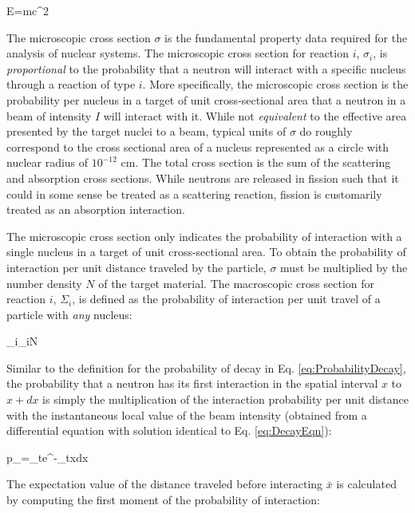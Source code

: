 \beq
E=mc^2
\eeq



The microscopic cross section \(\sigma\) is the fundamental property data required for the analysis of nuclear systems. The microscopic cross section for reaction \(i\), \(\sigma_i\), is {\it proportional} to the probability that a neutron will interact with a specific nucleus through a reaction of type \(i\). More specifically, the microscopic cross section is the probability per nucleus in a target of unit cross-sectional area that a neutron in a beam of intensity \(I\) will interact with it. While not {\it equivalent} to the effective area presented by the target nuclei to a beam, typical units of \(\sigma\) do roughly correspond to the cross sectional area of a nucleus represented as a circle with nuclear radius of \(10^{-12}\) cm. The total cross section is the sum of the scattering and absorption cross sections. While neutrons are released in fission such that it could in some sense be treated as a scattering reaction, fission is customarily treated as an absorption interaction.

The microscopic cross section only indicates the probability of interaction with a single nucleus in a target of unit cross-sectional area. To obtain the probability of interaction per unit distance traveled by the particle, \(\sigma\) must be multiplied by the number density \(N\) of the target material. The macroscopic cross section for reaction \(i\), \(\Sigma_i\), is defined as the probability of interaction per unit travel of a particle with {\it any} nucleus:

\beq
\label{eq:MacroscopicSigmaDef}
\Sigma_i\equiv\sigma_iN
\eeq

Similar to the definition for the probability of decay in Eq. \eqref{eq:ProbabilityDecay}, the probability that a neutron has its first interaction in the spatial interval \(x\) to \(x+dx\) is simply the multiplication of the interaction probability per unit distance with the instantaneous local value of the beam intensity (obtained from a differential equation with solution identical to Eq. \eqref{eq:DecayEqn}):

\beq
p_{}=\Sigma_te^{-\Sigma_tx}dx
\eeq

The expectation value of the distance traveled before interacting \(\bar{x}\) is calculated by computing the first moment of the probability of interaction:

